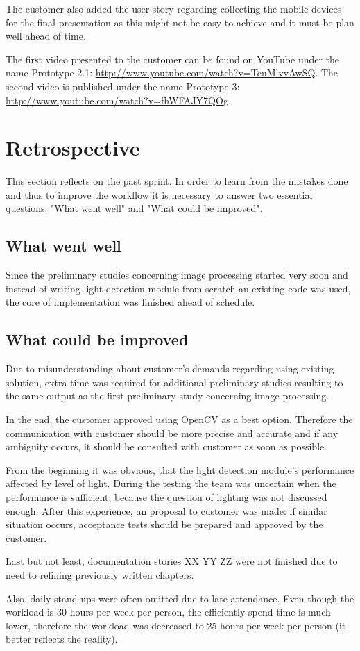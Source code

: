 The customer also added the user story regarding collecting the mobile devices for the final presentation as this might not be easy to achieve and it must be plan well ahead of time.

The first video presented to the customer can be found on YouTube under the name Prototype 2.1: \url{http://www.youtube.com/watch?v=TcuMlvvAwSQ}. The second video is published under the name Prototype 3: \url{http://www.youtube.com/watch?v=fhWFAJY7QOg}.

\section{Retrospective}
This section reflects on the past sprint. In order to learn from the mistakes done and thus to improve the workflow it is necessary to answer two essential questions: "What went well" and "What could be improved".

\subsection{What went well}
Since the preliminary studies concerning image processing started very soon and instead of writing light detection module from scratch an existing code was used, the core of implementation was finished ahead of schedule.

\subsection{What could be improved}
Due to misunderstanding about customer's demands regarding using existing solution, extra time was required for additional preliminary studies resulting to the same output as the first preliminary study concerning image processing. 

In the end, the customer approved using OpenCV as a best option.
Therefore the communication with customer should be more precise and accurate and if any ambiguity occurs, it should be consulted with customer as soon as possible.

From the beginning it was obvious, that the light detection module's performance affected by level of light.
During the testing the team was uncertain when the performance is sufficient, because the question of lighting was not discussed enough.
After this experience, an proposal to customer was made: if similar situation occurs, acceptance tests should be prepared and approved by the customer.

Last but not least, documentation stories XX YY ZZ were not finished due to need to refining previously written chapters.

Also, daily stand ups were often omitted due to late attendance.
Even though the workload is 30 hours per week per person, the efficiently spend time is much lower, therefore the workload was decreased to 25 hours per week per person (it better reflects the reality).
